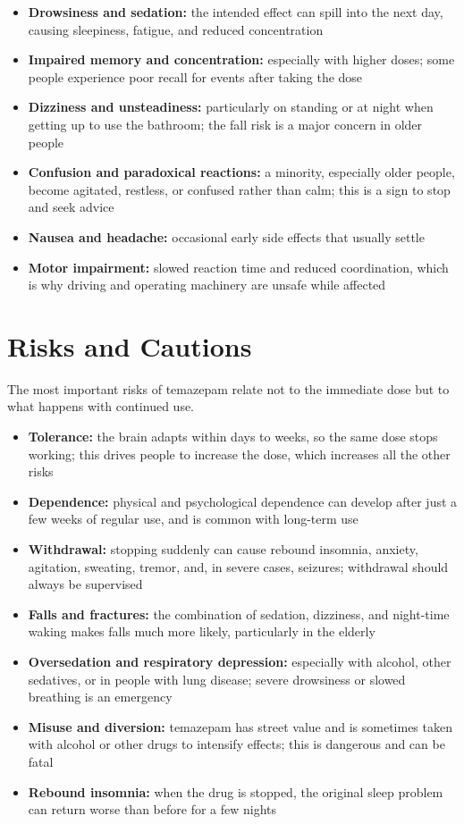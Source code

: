 \begin{itemize}
    \item \textbf{Drowsiness and sedation:} the intended effect can spill into the next day, causing sleepiness, fatigue, and reduced concentration
    \item \textbf{Impaired memory and concentration:} especially with higher doses; some people experience poor recall for events after taking the dose
    \item \textbf{Dizziness and unsteadiness:} particularly on standing or at night when getting up to use the bathroom; the fall risk is a major concern in older people
    \item \textbf{Confusion and paradoxical reactions:} a minority, especially older people, become agitated, restless, or confused rather than calm; this is a sign to stop and seek advice
    \item \textbf{Nausea and headache:} occasional early side effects that usually settle
    \item \textbf{Motor impairment:} slowed reaction time and reduced coordination, which is why driving and operating machinery are unsafe while affected
\end{itemize}

\section*{Risks and Cautions}
The most important risks of temazepam relate not to the immediate dose but to what happens with continued use.

\begin{itemize}
    \item \textbf{Tolerance:} the brain adapts within days to weeks, so the same dose stops working; this drives people to increase the dose, which increases all the other risks
    \item \textbf{Dependence:} physical and psychological dependence can develop after just a few weeks of regular use, and is common with long-term use
    \item \textbf{Withdrawal:} stopping suddenly can cause rebound insomnia, anxiety, agitation, sweating, tremor, and, in severe cases, seizures; withdrawal should always be supervised
    \item \textbf{Falls and fractures:} the combination of sedation, dizziness, and night-time waking makes falls much more likely, particularly in the elderly
    \item \textbf{Oversedation and respiratory depression:} especially with alcohol, other sedatives, or in people with lung disease; severe drowsiness or slowed breathing is an emergency
    \item \textbf{Misuse and diversion:} temazepam has street value and is sometimes taken with alcohol or other drugs to intensify effects; this is dangerous and can be fatal
    \item \textbf{Rebound insomnia:} when the drug is stopped, the original sleep problem can return worse than before for a few nights
\end{itemize}

